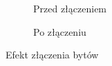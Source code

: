 \documentclass[12pt,a4paper]{article} %
\begin{document}
            \begin{figure}[h!]
            \centering
            \begin{subfigure}{.45\textwidth}
              \centering
              \caption{Przed złączeniem}
            \end{subfigure}
            \begin{subfigure}{.45\textwidth}
              \centering
              \caption{Po złączeniu}
            \end{subfigure}
            \caption{Efekt złączenia bytów}
            \label{fig:merge}
            \end{figure}
        
\end{document}
